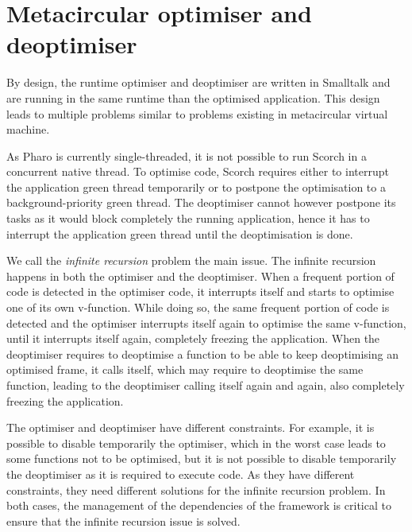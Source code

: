 \documentclass[a4paper,12pt,twoside]{../includes/ThesisStyle}
\begin{document}
\fi

\chapter{Metacircular optimiser and deoptimiser}
\label{chap:metacircular}
\minitoc

By design, the runtime optimiser and deoptimiser are written in Smalltalk and are running in the same runtime than the optimised application. This design leads to multiple problems similar to problems existing in metacircular virtual machine. 

As Pharo is currently single-threaded, it is not possible to run Scorch in a concurrent native thread. To optimise code, Scorch requires either to interrupt the application green thread temporarily or to postpone the optimisation to a background-priority green thread. The deoptimiser cannot however postpone its tasks as it would block completely the running application, hence it has to interrupt the application green thread until the deoptimisation is done.

We call the \emph{infinite recursion} problem the main issue. The infinite recursion happens in both the optimiser and the deoptimiser. When a frequent portion of code is detected in the optimiser code, it interrupts itself and starts to optimise one of its own v-function. While doing so, the same frequent portion of code is detected and the optimiser interrupts itself again to optimise the same v-function, until it interrupts itself again, completely freezing the application. When the deoptimiser requires to deoptimise a function to be able to keep deoptimising an optimised frame, it calls itself, which may require to deoptimise the same function, leading to the deoptimiser calling itself again and again, also completely freezing the application.

The optimiser and deoptimiser have different constraints. For example, it is possible to disable temporarily the optimiser, which in the worst case leads to some functions not to be optimised, but it is not possible to disable temporarily the deoptimiser as it is required to execute code. As they have different constraints, they need different solutions for the infinite recursion problem. In both cases, the management of the dependencies of the framework is critical to ensure that the infinite recursion issue is solved.
\end{document}
